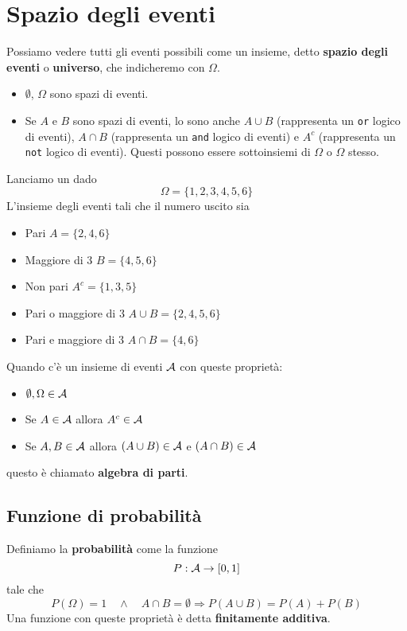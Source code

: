 \section{Spazio degli eventi}
Possiamo vedere tutti gli eventi possibili come un insieme, detto \textbf{spazio degli eventi} o
\textbf{universo}, che indicheremo con $\Omega$.
\begin{itemize}
	\item $\emptyset$, $\Omega$ sono spazi di eventi.
	\item Se $A$ e $B$ sono spazi di eventi, lo sono anche $A \cup B$ (rappresenta un \verb|or| logico di
	      eventi), $A \cap B$ (rappresenta un \verb|and| logico di eventi) e $A^c$ (rappresenta un
	      \verb|not| logico di eventi). Questi possono essere sottoinsiemi di $\Omega$ o $\Omega$ stesso.
\end{itemize}

\begin{example}
	Lanciamo un dado
	\[ \Omega = \{ 1, 2, 3, 4, 5, 6 \} \]
	L'insieme degli eventi tali che il numero uscito sia
	\begin{itemize}
		\item Pari $A = \{ 2, 4, 6 \}$
		\item Maggiore di 3 $B = \{ 4, 5, 6 \}$
		\item Non pari $A^c = \{ 1, 3, 5 \}$
		\item Pari o maggiore di 3 $A \cup B = \{ 2, 4, 5, 6 \}$
		\item Pari e maggiore di 3 $A \cap B = \{ 4, 6 \}$
	\end{itemize}
\end{example}

\begin{definition}
	Quando c'è un insieme di eventi $\mathcal{A}$ con queste proprietà:
	\begin{itemize}
		\item $\emptyset, \Omega \in \mathcal{A}$
		\item Se $A \in \mathcal{A}$ allora $A^c \in \mathcal{A}$
		\item Se $A, B \in \mathcal{A}$ allora $(A \cup B) \in \mathcal{A}$ e $(A \cap B) \in \mathcal{A}$
	\end{itemize}
	questo è chiamato \textbf{algebra di parti}.
\end{definition}

\subsection{Funzione di probabilità}
\begin{definition}[Provvisoria]
	Definiamo la \textbf{probabilità} come la funzione
	\[ P : \mathcal{A} \to [0, 1] \]
	tale che
	\[
		P (\Omega) = 1 \quad \land \quad
		A \cap B = \emptyset \Rightarrow P(A \cup B) = P(A) + P(B)
	\]
	Una funzione con queste proprietà è detta \textbf{finitamente additiva}.
\end{definition}

